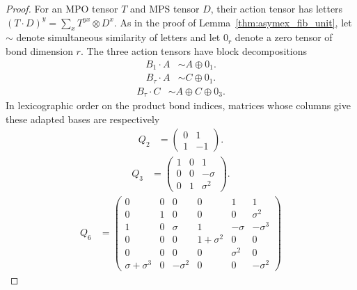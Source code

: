 \begin{proof}
    \leanok
    For an MPO tensor $T$ and MPS tensor $D$, their action tensor
    has letters $(T\cdot D)^y=\sum_xT^{yx}\otimes D^x$.
    As in the proof of Lemma~\ref{thm:asymex_fib_unit}, let $\sim$
    denote simultaneous similarity of letters and let $0_r$ denote
    a zero tensor of bond dimension $r$.
    The three action tensors have block decompositions
    \begin{align}
        B_1\cdot A & \sim A\oplus0_1.
        \label{eq:asymex_fib_action_blocks_unit}
    \end{align}
    \begin{align}
        B_\tau\cdot A & \sim C\oplus0_1.
        \label{eq:asymex_fib_action_blocks_product}
    \end{align}
    \begin{align}
        B_\tau\cdot C & \sim A\oplus C\oplus0_3.
        \label{eq:asymex_fib_action_blocks_chain}
    \end{align}
    In lexicographic order on the product bond indices, matrices whose
    columns give these adapted bases are respectively
    \begin{align}
        Q_2 & =\begin{pmatrix}0&1\\1&-1\end{pmatrix}.
    \end{align}
    \begin{align}
        Q_3 & =\begin{pmatrix}1&0&1\\0&0&-\sigma\\0&1&\sigma^2\end{pmatrix}.
    \end{align}
    \begin{align}
        Q_6 & =\begin{pmatrix}
                   0               & 0 & 0         & 0          & 1        & 1         \\
                   0               & 1 & 0         & 0          & 0        & \sigma^2  \\
                   1               & 0 & \sigma    & 1          & -\sigma  & -\sigma^3 \\
                   0               & 0 & 0         & 1+\sigma^2 & 0        & 0         \\
                   0               & 0 & 0         & 0          & \sigma^2 & 0         \\
                   \sigma+\sigma^3 & 0 & -\sigma^2 & 0          & 0        & -\sigma^2

\end{pmatrix}
\end{align}
\end{proof}
